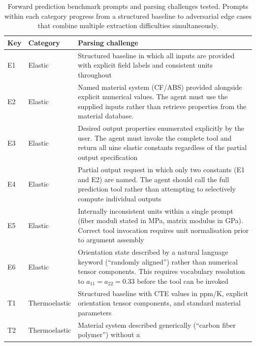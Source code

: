 \documentclass[preprint,review,10pt,number]{elsarticle}
\begin{document}
\begin{table}[h]
\centering
\caption{Forward prediction benchmark prompts and parsing 
challenges tested. Prompts within each category progress 
from a structured baseline to adversarial edge cases that 
combine multiple extraction difficulties simultaneously.}
\label{tab:benchmark_design}
\begin{tabularx}{\textwidth}{llX}
\toprule
Key & Category & Parsing challenge \\
\midrule
E1 & Elastic & Structured baseline in which all inputs are 
               provided with explicit field labels and 
               consistent units throughout \\
E2 & Elastic & Named material system (CF/ABS) provided 
               alongside explicit numerical values. The 
               agent must use the supplied inputs rather 
               than retrieve properties from the material 
               database. \\
E3 & Elastic & Desired output properties enumerated explicitly 
               by the user. The agent must invoke the 
               complete tool and return all nine elastic 
               constants regardless of the partial output 
               specification \\
E4 & Elastic & Partial output request in which only two 
               constants (E1 and E2) are named. The 
               agent should call the full prediction tool 
               rather than attempting to selectively compute 
               individual outputs \\
E5 & Elastic & Internally inconsistent units within a single 
               prompt (fiber moduli stated in MPa, matrix 
               modulus in GPa). Correct tool invocation 
               requires unit normalisation prior to argument 
               assembly \\
E6 & Elastic & Orientation state described by a natural 
               language keyword (``randomly aligned'') rather 
               than numerical tensor components. This requires 
               vocabulary resolution to $a_{11} = a_{22} = 
               0.33$ before the tool can be invoked \\
\midrule
T1 & Thermoelastic & Structured baseline with CTE values in 
                     ppm/K, explicit orientation tensor 
                     components, and standard material 
                     parameters \\
T2 & Thermoelastic & Material system described generically 
                     (``carbon fiber polymer'') without a 

\end{tabularx}
\end{table}
\end{document}
